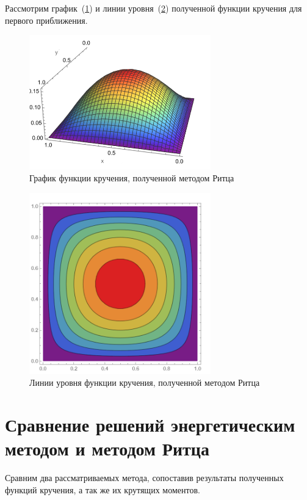\documentclass[12pt, a4paper]{article}
\begin{document}
Рассмотрим график~(\ref{ritz_graph}) и линии уровня~(\ref{ritz_levels}) полученной функции кручения для первого приближения.
\begin{figure}[!h]
	\centering
	\includegraphics[width=0.7\textwidth]{ritz_graph}%
	\caption{График функции кручения, полученной методом Ритца}
	\vspace*{-2mm}
	\label{ritz_graph}
\end{figure}
\begin{figure}[!h]
	\centering
	\includegraphics[width=0.7\textwidth]{ritz_levels}%
	\caption{Линии уровня функции кручения, полученной методом Ритца}
	\vspace*{-2mm}
	\label{ritz_levels}
\end{figure}
\newpage
\section{Сравнение решений энергетическим методом и методом Ритца}

Сравним два рассматриваемых метода, сопоставив результаты полученных функций кручения, а так же их крутящих моментов.
\end{document}
